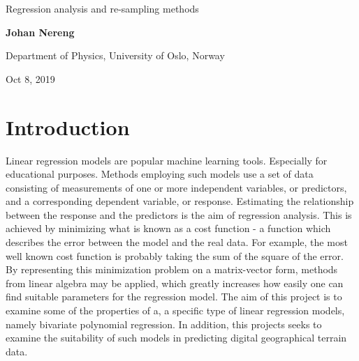 \documentclass[%
oneside,                 %
final,                   %
10pt]{article}
\begin{document}

\newcommand{\exercisesection}[1]{\subsection*{#1}}






\thispagestyle{empty}

\begin{center}
{\LARGE\bf
\begin{spacing}{1.25}
Regression analysis and re-sampling methods
\end{spacing}
}
\end{center}


\begin{center}
{\bf Johan Nereng}
\end{center}

    \begin{center}
\centerline{{\small Department of Physics, University of Oslo, Norway}}
\end{center}
    

\begin{center}
Oct 8, 2019
\end{center}

\vspace{5cm}
\begin{abstract}

\end{abstract}

\newpage

\section{Introduction}
Linear regression models are popular machine learning tools. Especially for educational purposes. Methods employing such models use a set of data consisting of measurements of one or more independent variables, or predictors, and a corresponding dependent variable, or response. Estimating the relationship between the response and the predictors is the aim of regression analysis. This is achieved by minimizing what is known as a cost function - a function which describes the error between the model and the real data. For example, the most well known cost function is probably taking the sum of the square of the error. By representing this minimization problem on a matrix-vector form, methods from linear algebra may be applied, which greatly increases how easily one can find suitable  parameters for the regression model.%
The aim of this project is to examine some of the properties of a, a specific type of linear regression models, namely bivariate polynomial regression. In addition, this projects seeks to examine the suitability of such models in predicting digital geographical terrain data.
\end{document}
